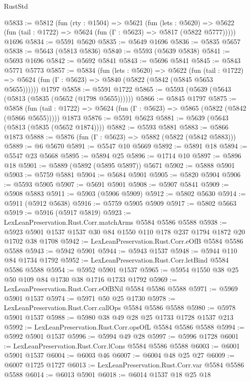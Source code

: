 \begin{lexlean}{RustStd}
\begin{coremodule}
@5833 := @5812
    (fun (rty : @1504) =>
    @5621
      (fun (lets : @5620) =>
      @5622 (fun (tail : @1722) => @5624 (fun (Γ : @5623) => @5817 (@5822 @5777)))))
    @1696
@5834 := @5591 @5620
@5835 := @5649 @1696
@5836 := @5835 @5657
@5838 := @5643 (@5813 @5836)
@5840 := @5593 (@5639 @5838)
@5841 := @5693 @1696
@5842 := @5692 @5841
@5843 := @5696 @5841
@5845 := @5843 @5771 @5773
@5857 := @5834
    (fun (lets : @5620) =>
    @5622
      (fun (tail : @1722) => @5624 (fun (Γ : @5623) => @5840 (@5822 (@5842 (@5845 @5653 @5655))))))
    @1797
@5858 := @5591 @1722
@5865 := @5593 (@5639 (@5643 (@5813 (@5835 (@5652 (@1798 @5655))))))
@5866 := @5845 @1797
@5875 := @5858
    (fun (tail : @1722) => @5624 (fun (Γ : @5623) => @5865 (@5822 (@5842 (@5866 @5655)))))
    @1873
@5876 := @5591 @5623
@5881 := @5639 (@5643 (@5813 (@5835 (@5652 @1874))))
@5882 := @5593 @5881
@5883 := @5866 @1873
@5888 := @5876 (fun (Γ : @5623) => @5882 (@5822 (@5842 @5883)))
@5889 := @6 @5670
@5891 := @5547 @10 @5669
@5892 := @5891 @18
@5894 := @5547 @23 @5668
@5895 := @5894 @25
@5896 := @1714 @10
@5897 := @5896 @18
@5901 := @5889 (@5892 (@5895 @5897)) @5671
@5902 := @5888 @5901
@5903 := @5759 @5881
@5904 := @5684 @5901
@5905 := @5820 @5904
@5906 := @5593 @5905
@5907 := @5691 @5901
@5908 := @5907 @5841
@5909 := @5908 @5883
@5911 := @5903 (@5906 @5909)
@5912 := @5802 @5630
@5914 := @5911 (@5912 @5638)
@5916 := @5759 @5905 @5909
@5917 := @5802 @5663
@5919 := @5916 (@5917 @5819)
@5923 := LexLeanPreservation.Rust.Corr.matchArms @5584 @5586 @5588
@5938 := @5923 @5901 @1537 @1537 @30 @84 @1550 @110 @178 @237 @1794 @1872 @20 @1702 @38 @1708
@5942 := LexLeanPreservation.Rust.Corr.eOfB @5584 @5586 @5588
@5943 := @5942 @5901
@5944 := @5943 @1537
@5948 := @5944 @110 @84 @1734 @1792
@5952 := LexLeanPreservation.Rust.Corr.letBind @5584 @5586 @5588
@5954 := @5952 @5901 @1537
@5965 := @5954 @1550 @38 @25 @50 @109 @84 @1730 @38 @1716 @1733 @1792
@5969 := LexLeanPreservation.Rust.Corr.eOfBNil @5584 @5586 @5588
@5971 := @5969 @5901 @1537
@5974 := @5971 @50 @25 @1730
@5978 := LexLeanPreservation.Rust.Corr.callOps @5584 @5586 @5588
@5980 := @5978 @5901 @1537
@5988 := @5980 @38 @49 @28 @25 @1733 @1728 @1537 @213
@5992 := LexLeanPreservation.Rust.Corr.opsOfL @5584 @5586 @5588
@5994 := @5992 @5901 @1537
@5996 := @5994 @49 @28
@5997 := @5996 @1728
@6001 := LexLeanPreservation.Rust.Corr.lCons @5584 @5586 @5588
@6003 := @6001 @5901 @1537
@6004 := @6003 @46
@6007 := @6004 @48 @25 @27
@6009 := @6007 @1725 @1727
@6013 := LexLeanPreservation.Rust.Corr.var @5584 @5586 @5588
@6014 := @6013 @5901
@6018 := @6014 @1537 @18 @25 @18

\end{coremodule}
\end{lexlean}

